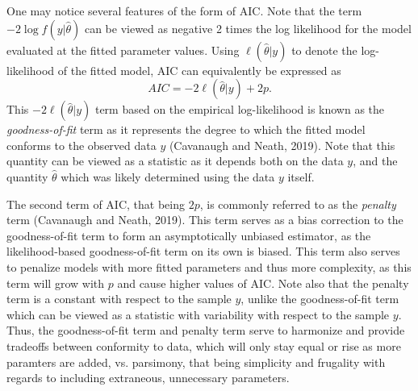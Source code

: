 		One may notice several features of the form of AIC. Note that the term $-2 \log f(y|\hat{\theta})$ can be viewed as negative 2 times the log likelihood for the model evaluated
		at the fitted parameter values. Using $\ell(\hat{\theta}|y)$ to denote the log-likelihood of the fitted model, AIC can equivalently be expressed as
		\begin{equation}
			AIC = -2 \ell(\hat{\theta}|y) + 2 p.
		\end{equation}
		This $-2 \ell(\hat{\theta}|y)$ term based on the empirical log-likelihood is known as the \textit{goodness-of-fit} term as it represents the degree to which the fitted model
		conforms to the observed data $y$ (Cavanaugh and Neath, 2019). Note that this quantity can be viewed as a statistic as it depends both on the data $y$, and the quantity
		$\hat{\theta}$ which was likely determined using the data $y$ itself.

		The second term of AIC, that being $2 p$, is commonly referred to as the \textit{penalty} term (Cavanaugh and Neath, 2019). This term serves as a bias correction to the goodness-of-fit
		term to form an asymptotically unbiased estimator, as the likelihood-based goodness-of-fit term on its own is biased. This term also serves to penalize models with more fitted parameters and
		thus more complexity, as this term will grow with $p$ and cause higher values of AIC. Note also that the penalty term is a constant with respect to the sample $y$, unlike the goodness-of-fit
		term which can be viewed as a statistic with variability with respect to the sample $y$. Thus, the goodness-of-fit term and penalty term serve to harmonize and provide tradeoffs between
		conformity to data, which will only stay equal or rise as more paramters are added, vs. parsimony, that being simplicity and frugality with regards to including extraneous, unnecessary
		parameters.


